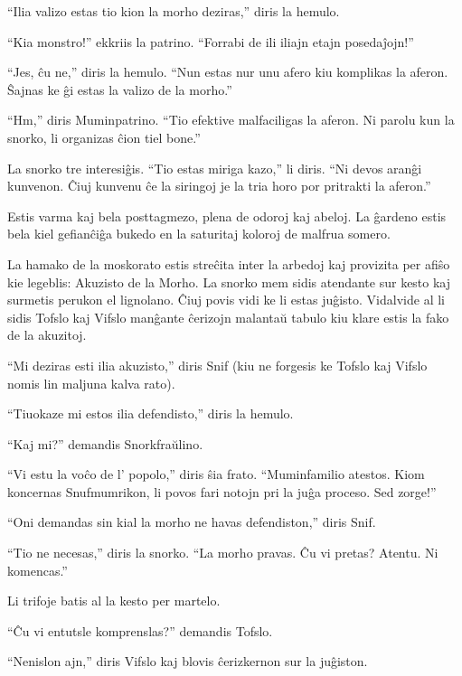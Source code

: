 ``Ilia valizo estas tio kion la morho deziras,'' diris la hemulo.

``Kia monstro!'' ekkriis la patrino. ``Forrabi de ili iliajn etajn posedaĵojn!''

``Jes, ĉu ne,'' diris la hemulo. ``Nun estas nur unu afero kiu komplikas la aferon. Ŝajnas ke ĝi estas la valizo de la morho.''

``Hm,'' diris Muminpatrino. ``Tio efektive malfaciligas la aferon. Ni parolu kun la snorko, li organizas ĉion tiel bone.''

La snorko tre interesiĝis. ``Tio estas miriga kazo,'' li diris. ``Ni devos aranĝi kunvenon. Ĉiuj kunvenu ĉe la siringoj je la tria horo por pritrakti la aferon.''

Estis varma kaj bela posttagmezo, plena de odoroj kaj abeloj. La ĝardeno estis bela kiel gefianĉiĝa bukedo en la saturitaj koloroj de malfrua somero.

La hamako de la moskorato estis streĉita inter la arbedoj kaj provizita per afiŝo kie legeblis: Akuzisto de la Morho. La snorko mem sidis atendante sur kesto kaj surmetis perukon el lignolano. Ĉiuj povis vidi ke li estas juĝisto. Vidalvide al li sidis Tofslo kaj Vifslo manĝante ĉerizojn malantaŭ tabulo kiu klare estis la fako de la akuzitoj.

``Mi deziras esti ilia akuzisto,'' diris Snif (kiu ne forgesis ke Tofslo kaj Vifslo nomis lin maljuna kalva rato).

``Tiuokaze mi estos ilia defendisto,'' diris la hemulo.

``Kaj mi?'' demandis Snorkfraŭlino.

``Vi estu la voĉo de l' popolo,'' diris ŝia frato. ``Muminfamilio atestos. Kiom koncernas Snufmumrikon, li povos fari notojn pri la juĝa proceso. Sed zorge!''

``Oni demandas sin kial la morho ne havas defendiston,'' diris Snif.

``Tio ne necesas,'' diris la snorko. ``La morho pravas. Ĉu vi pretas? Atentu. Ni komencas.''

Li trifoje batis al la kesto per martelo.

``Ĉu vi entutsle komprenslas?'' demandis Tofslo.

``Nenislon ajn,'' diris Vifslo kaj blovis ĉerizkernon sur la juĝiston.

